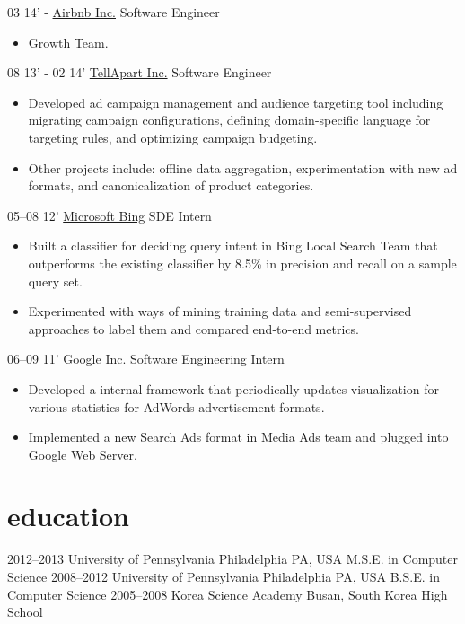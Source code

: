 \documentclass[]{patyoon-cv}
\begin{document}
\begin{entrylist}
  \entry
  {03 14' - }
  {\href{https://www.airbnb.com/}{Airbnb Inc.}}
  {Software Engineer}
  {\begin{itemize}
      \item Growth Team.
    \end{itemize}
  }
  \entry
  {08 13' - 02 14'}
  {\href{https://tellapart.com/}{TellApart Inc.}}
  {Software Engineer}
  {\begin{itemize}
    \item Developed ad campaign management and audience targeting tool including migrating campaign configurations, defining domain-specific language for targeting rules, and optimizing campaign budgeting.
    \item Other projects include: offline data aggregation, experimentation with new ad formats, and canonicalization of product categories.
    \end{itemize}
  }
  \entry
  {05–08 12'}
  {\href{http://bing.com/}{Microsoft Bing}}
  {SDE Intern}
  {\begin{itemize}
    \item Built a classifier for deciding query intent in Bing Local Search Team that outperforms the existing classifier by 8.5\% in precision and recall on a sample query set.
    \item Experimented with ways of mining training data and semi-supervised approaches to label them and compared end-to-end metrics.
    \end{itemize}}
  \entry
  {06–09 11'}
  {\href{http://www.google.com}{Google Inc.}}
  {Software Engineering Intern}
  {\begin{itemize}
    \item Developed a internal framework that periodically updates visualization for various statistics for AdWords advertisement formats.
    \item Implemented a new Search Ads format in Media Ads team and plugged into Google Web Server.
    \end{itemize}}
\end{entrylist}

\section{education}

\begin{entrylist}
  \entry
  {2012–2013}
  {University of Pennsylvania}
  {Philadelphia PA, USA}
  {M.S.E. in Computer Science}
  \entry
  {2008–2012}
  {University of Pennsylvania}
  {Philadelphia PA, USA}
  {B.S.E. in Computer Science}
  \entry
  {2005–2008}
  {Korea Science Academy}
  {Busan, South Korea}
  {High School}
\end{entrylist}
\end{document}
